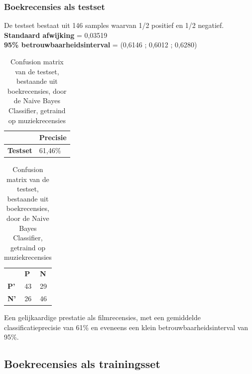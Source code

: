 \subsubsection{Boekrecensies als testset}\label{Boekrecensies als testset}

De testset bestaat uit 146 samples waarvan 1/2 positief en 1/2 negatief.\\

\textbf{Standaard afwijking} = 0,03519\\
\textbf{95\% betrouwbaarheidsinterval} = (0,6146 ; 0,6012 ; 0,6280)
 
\begin{table}[h]
\centering
\setlength\tabcolsep{4pt}
\begin{minipage}[t]{0.48\textwidth}
\centering
\begin{tabular}{l|l|}
\cline{2-2}
                                            & \textbf{Precisie} \\ \hline
\multicolumn{1}{|l|}{\textbf{Testset}}      & 61,46\%           \\ \hline
\end{tabular}
\caption{Classificatieprecisie Naive Bayes Classifier, getraind op muziekrecensies, getest op boekrecensies}
\end{minipage}%
\hfill
\begin{minipage}[t]{0.48\textwidth}
\centering
\begin{tabular}{lll}
                                 & \textbf{P}               & \textbf{N}               \\ \cline{2-3} 
\multicolumn{1}{l|}{\textbf{P'}} & \multicolumn{1}{l|}{43} & \multicolumn{1}{l|}{29} \\ \cline{2-3} 
\multicolumn{1}{l|}{\textbf{N'}} & \multicolumn{1}{l|}{26} & \multicolumn{1}{l|}{46} \\ \cline{2-3} 
\end{tabular}
\caption{Confusion matrix van de testset, bestaande uit boekrecensies, door de  Naive Bayes Classifier, getraind op muziekrecensies} 
\end{minipage}
\end{table}


Een gelijkaardige prestatie als filmrecensies, met een gemiddelde classificatieprecisie van 61\% en eveneens een klein betrouwbaarheidsinterval van 95\%.

\subsection{Boekrecensies als trainingsset}\label{Boekrecensies als trainingsset}

